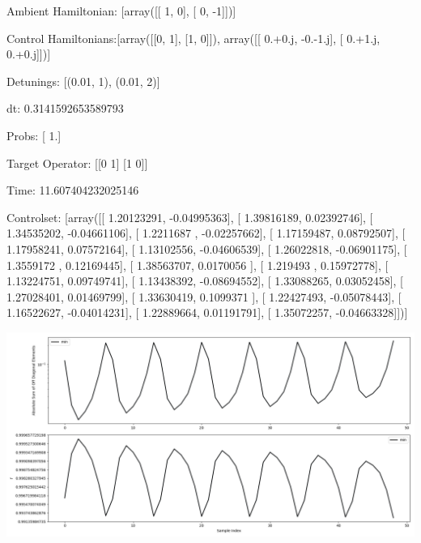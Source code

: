 \documentclass{article}
\begin{document}
    

\newpage

Ambient Hamiltonian: [array([[ 1,  0],
       [ 0, -1]])]

Control Hamiltonians:[array([[0, 1],
       [1, 0]]), array([[ 0.+0.j, -0.-1.j],
       [ 0.+1.j,  0.+0.j]])]

Detunings: [(0.01, 1), (0.01, 2)]

 dt: 0.3141592653589793

Probs: [ 1.]

Target Operator: [[0 1]
 [1 0]]

Time: 11.607404232025146

Controlset: [array([[ 1.20123291, -0.04995363],
       [ 1.39816189,  0.02392746],
       [ 1.34535202, -0.04661106],
       [ 1.2211687 , -0.02257662],
       [ 1.17159487,  0.08792507],
       [ 1.17958241,  0.07572164],
       [ 1.13102556, -0.04606539],
       [ 1.26022818, -0.06901175],
       [ 1.3559172 ,  0.12169445],
       [ 1.38563707,  0.0170056 ],
       [ 1.219493  ,  0.15972778],
       [ 1.13224751,  0.09749741],
       [ 1.13438392, -0.08694552],
       [ 1.33088265,  0.03052458],
       [ 1.27028401,  0.01469799],
       [ 1.33630419,  0.1099371 ],
       [ 1.22427493, -0.05078443],
       [ 1.16522627, -0.04014231],
       [ 1.22889664,  0.01191791],
       [ 1.35072257, -0.04663328]])]
\begin{center}
\includegraphics[scale=.9]{report_pickled_controls97/control_dpn_all.png}

\end{center}
\end{document}
